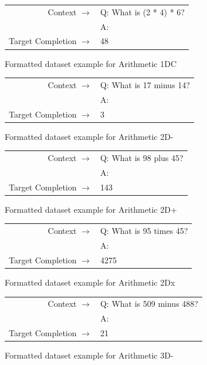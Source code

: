 \documentclass{article}
\begin{document}
\begin{figure} { \tt \footnotesize \begin{tabularx}{\linewidth}{r X} \toprule Context $\to$ & Q: What is (2 * 4) * 6? \\
 & A: \\
 \midrule Target Completion $\to$ & 48 \\
 \bottomrule \end{tabularx} }  \caption{Formatted dataset example for Arithmetic 1DC}  \label{eval:single_digit_three_ops}  \end{figure}
\begin{figure} { \tt \footnotesize \begin{tabularx}{\linewidth}{r X} \toprule Context $\to$ & Q: What is 17 minus 14? \\
 & A: \\
 \midrule Target Completion $\to$ & 3 \\
 \bottomrule \end{tabularx} }  \caption{Formatted dataset example for Arithmetic 2D-}  \label{eval:two_digit_subtraction}  \end{figure}
\begin{figure} { \tt \footnotesize \begin{tabularx}{\linewidth}{r X} \toprule Context $\to$ & Q: What is 98 plus 45? \\
 & A: \\
 \midrule Target Completion $\to$ & 143 \\
 \bottomrule \end{tabularx} }  \caption{Formatted dataset example for Arithmetic 2D+}  \label{eval:two_digit_addition}  \end{figure}
    \begin{figure} { \tt \footnotesize \begin{tabularx}{\linewidth}{r X} \toprule Context $\to$ & Q: What is 95 times 45? \\
 & A: \\
 \midrule Target Completion $\to$ & 4275 \\
 \bottomrule \end{tabularx} }  \caption{Formatted dataset example for Arithmetic 2Dx}  \label{eval:two_digit_multiplication}  \end{figure}
\begin{figure} { \tt \footnotesize \begin{tabularx}{\linewidth}{r X} \toprule Context $\to$ & Q: What is 509 minus 488? \\
 & A: \\
 \midrule Target Completion $\to$ & 21 \\
 \bottomrule \end{tabularx} }  \caption{Formatted dataset example for Arithmetic 3D-}  \label{eval:three_digit_subtraction}  \end{figure}
\end{document}
